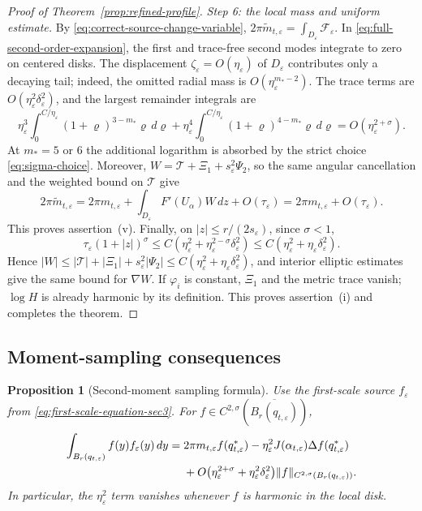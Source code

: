 \documentclass[11pt,reqno]{amsart}
\numberwithin{equation}{section}
\newtheorem{proposition}[theorem]{Proposition}
\theoremstyle{definition}
\theoremstyle{remark}
\newcommand{\eps}{\varepsilon}
\newcommand{\etae}{\eta_{\eps}}
\newcommand{\de}{\delta_{\eps}}
\begin{document}
\begin{proof}[Proof of Theorem~\ref{prop:refined-profile}]
\medskip\noindent
\emph{Step 6: the local mass and uniform estimate.}
By \eqref{eq:correct-source-change-variable},
$2\pi\widetilde m_{t,\eps}=\int_{D_\eps}\mathcal F_\eps$.
In \eqref{eq:full-second-order-expansion}, the first and trace-free
second modes integrate to zero on centered disks. The displacement
$\zeta_\eps=O(\etae)$ of $D_\eps$ contributes only a decaying tail;
indeed, the omitted radial mass is $O(\etae^{m_*-2})$.
The trace terms are $O(\etae^2\de^2)$, and the largest remainder
integrals are
\[
 \etae^3\int_0^{C/\etae}(1+\varrho)^{3-m_*}\varrho\,d\varrho
 +\etae^4\int_0^{C/\etae}(1+\varrho)^{4-m_*}\varrho\,d\varrho
 =O(\etae^{2+\sigma}).
\]
At $m_*=5$ or $6$ the additional logarithm is absorbed by the strict
choice \eqref{eq:sigma-choice}. Moreover,
$W=\mathcal T+\Xi_1+s_\eps^2\Psi_2$, so the same angular cancellation
and the weighted bound on $\mathcal T$ give
\[
 2\pi\widetilde m_{t,\eps}
 =2\pi m_{t,\eps}+\int_{D_\eps}F'(U_\alpha)W\,dz+O(\tau_\eps)
 =2\pi m_{t,\eps}+O(\tau_\eps).
\]
This proves assertion~(v).
Finally, on $|z|\le r/(2s_\eps)$, since $\sigma<1$,
\[
 \tau_\eps(1+|z|)^\sigma
 \le C(\etae^2+\etae^{2-\sigma}\de^2)
 \le C(\etae^2+\etae\de^2).
\]
Hence $|W|\le|\mathcal T|+|\Xi_1|+s_\eps^2|\Psi_2|
\le C(\etae^2+\etae\de^2)$, and interior elliptic estimates give
the same bound for $\nabla W$.
If $\varphi_i$ is constant, $\Xi_1$ and the metric trace vanish;
$\log H$ is already harmonic by its definition. This proves assertion~(i) and
completes the theorem.
\end{proof}

\subsection{Moment-sampling consequences}
\label{app:moment-consequences}

\begin{proposition}[Second-moment sampling formula]
\label{prop:moment-sampling}
Use the first-scale source $f_\eps$ from
\eqref{eq:first-scale-equation-sec3}. For
$f\in C^{2,\sigma}(\overline{B_r(q_{t,\eps})})$,
\begin{align}
  \int_{B_r(q_{t,\eps})}f(y)f_\eps(y)\,dy
  ={}&2\pi m_{t,\eps}f(q_{t,\eps}^*)
  -\etae^2J(\alpha_{t,\eps})
   \Delta f(q_{t,\eps}^*)
  \notag\\
  &+O\bigl(\etae^{2+\sigma}
  +\etae^2\de^2\bigr)
  \|f\|_{C^{2,\sigma}(B_r(q_{t,\eps}))}.
  \label{eq:moment-sampling}
\end{align}
In particular, the $\etae^2$ term vanishes whenever $f$ is harmonic in the
local disk.
\end{proposition}
\end{document}

